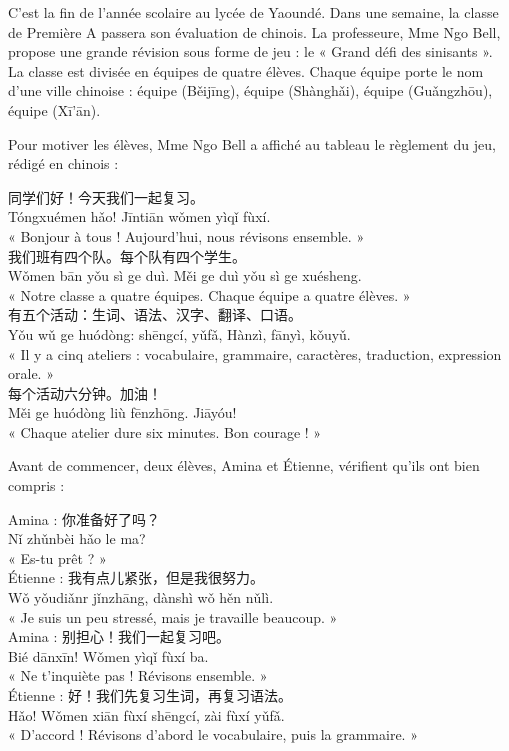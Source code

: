 \documentclass[11pt]{article}
\newcounter{popsec}
\newcounter{popsub}
\newcommand{\courssub}[1]{%
  \stepcounter{popsub}%
  \par\vspace{9pt}\noindent{\popxbold\fontsize{11.5}{13}\selectfont\color{popink}{\color{poporange}\thepopsec.\thepopsub}\hspace{6pt}#1}\par\nopagebreak\vspace{4pt}
}
\newcommand{\zh}[1]{\ifmmode\text{#1}\else{#1}\fi}
\begin{document}
\courssub{Situation}

C'est la fin de l'année scolaire au lycée de Yaoundé. Dans une semaine, la classe de Première A passera son évaluation de chinois. La professeure, Mme Ngo Bell, propose une grande révision sous forme de jeu : le « Grand défi des sinisants ». La classe est divisée en équipes de quatre élèves. Chaque équipe porte le nom d'une ville chinoise : équipe \zh{北京} (Běijīng), équipe \zh{上海} (Shànghǎi), équipe \zh{广州} (Guǎngzhōu), équipe \zh{西安} (Xī'ān).

Pour motiver les élèves, Mme Ngo Bell a affiché au tableau le règlement du jeu, rédigé en chinois :

\begin{textebox}
同学们好！今天我们一起复习。\\
Tóngxuémen hǎo! Jīntiān wǒmen yìqǐ fùxí.\\
« Bonjour à tous ! Aujourd'hui, nous révisons ensemble. »\\[4pt]
我们班有四个队。每个队有四个学生。\\
Wǒmen bān yǒu sì ge duì. Měi ge duì yǒu sì ge xuésheng.\\
« Notre classe a quatre équipes. Chaque équipe a quatre élèves. »\\[4pt]
有五个活动：生词、语法、汉字、翻译、口语。\\
Yǒu wǔ ge huódòng: shēngcí, yǔfǎ, Hànzì, fānyì, kǒuyǔ.\\
« Il y a cinq ateliers : vocabulaire, grammaire, caractères, traduction, expression orale. »\\[4pt]
每个活动六分钟。加油！\\
Měi ge huódòng liù fēnzhōng. Jiāyóu!\\
« Chaque atelier dure six minutes. Bon courage ! »
\end{textebox}

Avant de commencer, deux élèves, Amina et Étienne, vérifient qu'ils ont bien compris :

\begin{textebox}
Amina : 你准备好了吗？\\
Nǐ zhǔnbèi hǎo le ma?\\
« Es-tu prêt ? »\\[4pt]
Étienne : 我有点儿紧张，但是我很努力。\\
Wǒ yǒudiǎnr jǐnzhāng, dànshì wǒ hěn nǔlì.\\
« Je suis un peu stressé, mais je travaille beaucoup. »\\[4pt]
Amina : 别担心！我们一起复习吧。\\
Bié dānxīn! Wǒmen yìqǐ fùxí ba.\\
« Ne t'inquiète pas ! Révisons ensemble. »\\[4pt]
Étienne : 好！我们先复习生词，再复习语法。\\
Hǎo! Wǒmen xiān fùxí shēngcí, zài fùxí yǔfǎ.\\
« D'accord ! Révisons d'abord le vocabulaire, puis la grammaire. »
\end{textebox}
\end{document}
